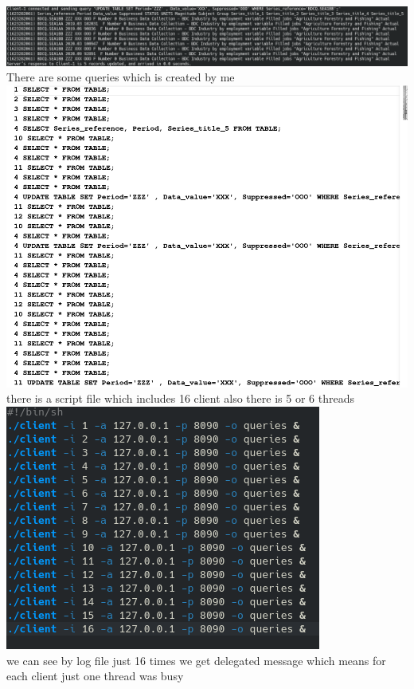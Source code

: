 \documentclass{report}
\begin{document}
\includegraphics[width=\textwidth,height=\textheight,keepaspectratio]{images/cliupdated.png}\\There are some queries which is created by me \\
\includegraphics[width=\textwidth,height=\textheight,keepaspectratio]{images/queries.png}\\ there is a script file which includes 16 client also there is 5 or 6 threads\\
\includegraphics[width=\textwidth,height=\textheight,keepaspectratio]{images/script.png}\\ we can see by log file just 16 times we get delegated message which means for each client just one thread was busy\\
\end{document}
